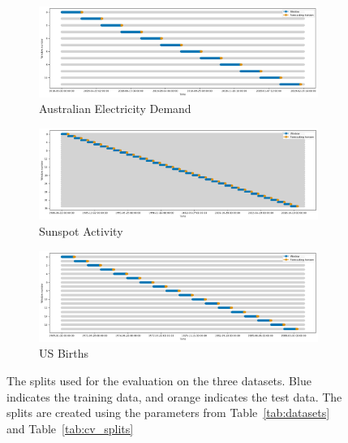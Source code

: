 \begin{figure}
    \centering
    \begin{subfigure}{1\textwidth}
        \centering
        \includegraphics[width=\textwidth]{Figures/AusElecSplit.png}
        \caption{Australian Electricity Demand}
        \label{fig:aus_split}
    \end{subfigure}

    \begin{subfigure}{1\textwidth}
        \centering
        \includegraphics[width=\textwidth]{Figures/SunspotSplit.png}
        \caption{Sunspot Activity}
        \label{fig:sunspot_split}
    \end{subfigure}

    \begin{subfigure}{1\textwidth}
        \centering
        \includegraphics[width=\textwidth]{Figures/USBirthSplit.png}
        \caption{US Births}
        \label{fig:usbirth_split}

    \end{subfigure}
    \caption{The splits used for the evaluation on the three datasets. Blue indicates the training data, and orange indicates the test data. The splits are created using the parameters from Table~\ref{tab:datasets} and Table~\ref{tab:cv_splits}}
    \label{fig:splits}
\end{figure}

